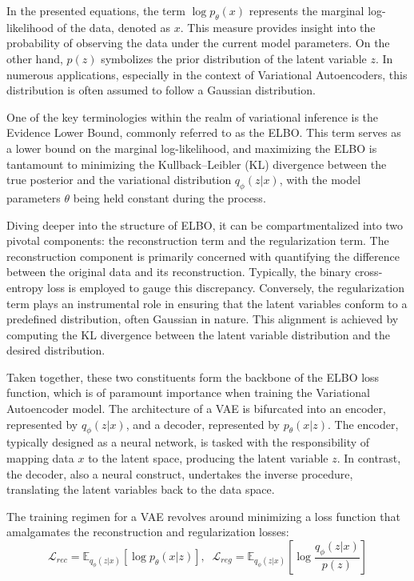 \documentclass[preprint,12pt,authoryear]{elsarticle}
\begin{document}
In the presented equations, the term \(\log p_\theta(x)\) represents the marginal log-likelihood of the data, denoted as \(x\). This measure provides insight into the probability of observing the data under the current model parameters. On the other hand, \(p(z)\) symbolizes the prior distribution of the latent variable \(z\). In numerous applications, especially in the context of Variational Autoencoders, this distribution is often assumed to follow a Gaussian distribution.

One of the key terminologies within the realm of variational inference is the Evidence Lower Bound, commonly referred to as the ELBO. This term serves as a lower bound on the marginal log-likelihood, and maximizing the ELBO is tantamount to minimizing the Kullback--Leibler (KL) divergence between the true posterior and the variational distribution \(q_\phi(z|x)\), with the model parameters \(\theta\) being held constant during the process.

Diving deeper into the structure of ELBO, it can be compartmentalized into two pivotal components: the reconstruction term and the regularization term. The reconstruction component is primarily concerned with quantifying the difference between the original data and its reconstruction. Typically, the binary cross-entropy loss is employed to gauge this discrepancy. Conversely, the regularization term plays an instrumental role in ensuring that the latent variables conform to a predefined distribution, often Gaussian in nature. This alignment is achieved by computing the KL divergence between the latent variable distribution and the desired distribution.

Taken together, these two constituents form the backbone of the ELBO loss function, which is of paramount importance when training the Variational Autoencoder model. The architecture of a VAE is bifurcated into an encoder, represented by \(q_\phi(z|x)\), and a decoder, represented by \(p_\theta(x|z)\). The encoder, typically designed as a neural network, is tasked with the responsibility of mapping data \(x\) to the latent space, producing the latent variable \(z\). In contrast, the decoder, also a neural construct, undertakes the inverse procedure, translating the latent variables back to the data space.

The training regimen for a VAE revolves around minimizing a loss function that amalgamates the reconstruction and regularization losses:
\begin{equation}
    \mathcal{L}_{rec} = \mathbb{E}_{q_\phi(z|x)}[\log p_\theta(x|z)], \;\;
    \mathcal{L}_{reg} = \mathbb{E}_{q_\phi(z|x)}[\log \frac{q_\phi(z|x)}{p(z)}]
\end{equation}
\end{document}
